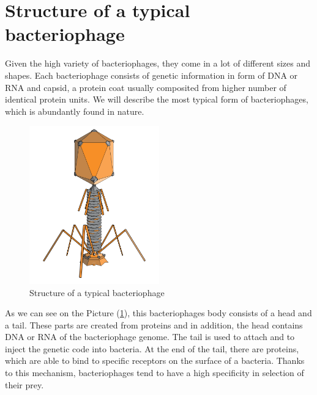\section{Structure of a typical bacteriophage}
Given the high variety of bacteriophages, they come in a lot of different sizes and shapes.
Each bacteriophage consists of genetic information in form of DNA or RNA and capsid, a protein coat usually composited from higher number of identical protein units.
We will describe the most typical form of bacteriophages, which is abundantly found in nature.

\begin{figure}[h]
\includegraphics[width=0.5\textwidth]{./images/phage.png}
\centering
\caption{Structure of a typical bacteriophage
}
\label{fig:phage}
\end{figure}


As we can see on the Picture (\ref{fig:phage}), this bacteriophages body consists of a head and a tail.
These parts are created from proteins and in addition, the head contains DNA or RNA of the bacteriophage genome.
The tail is used to attach and to inject the genetic code into bacteria.
At the end of the tail, there are proteins, which are able to bind to specific receptors on the surface of a bacteria.
Thanks to this mechanism, bacteriophages tend to have a high specificity in selection of their prey.

